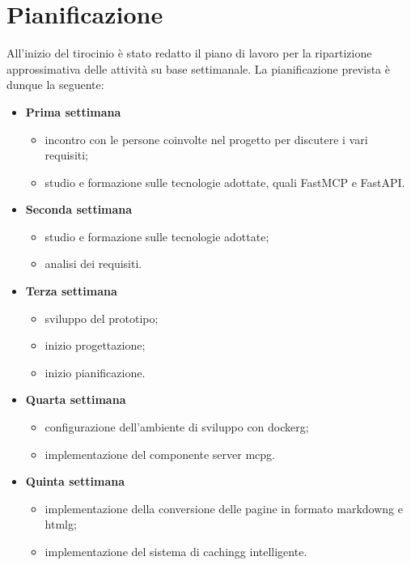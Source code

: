\section{Pianificazione}
All'inizio del tirocinio è stato redatto il piano di lavoro per 
la ripartizione approssimativa delle attività su base settimanale.
La pianificazione prevista è dunque la seguente:
\begin{itemize}
    \item \textbf{Prima settimana} 
        \begin{itemize}
            \item incontro con le persone coinvolte nel progetto per discutere 
            i vari requisiti;
            \item studio e formazione sulle tecnologie adottate, 
            quali FastMCP e FastAPI.
        \end{itemize}
    \item \textbf{Seconda settimana }
        \begin{itemize}
            \item studio e formazione sulle tecnologie adottate;
            \item analisi dei requisiti.
        \end{itemize}
    \item \textbf{Terza settimana }
        \begin{itemize}
            \item sviluppo del prototipo;
            \item inizio progettazione;
            \item inizio pianificazione.
        \end{itemize}
    \item \textbf{Quarta settimana }
        \begin{itemize}
            \item configurazione dell'ambiente di sviluppo con \gls{dockerg};
            \item implementazione del componente server \gls{mcpg}.
        \end{itemize}
    \item \textbf{Quinta settimana }
        \begin{itemize}
            \item implementazione della conversione delle pagine in 
            formato \gls{markdowng} e \gls{htmlg};
            \item implementazione del sistema di \gls{cachingg} intelligente.

\end{itemize}
\end{itemize}
